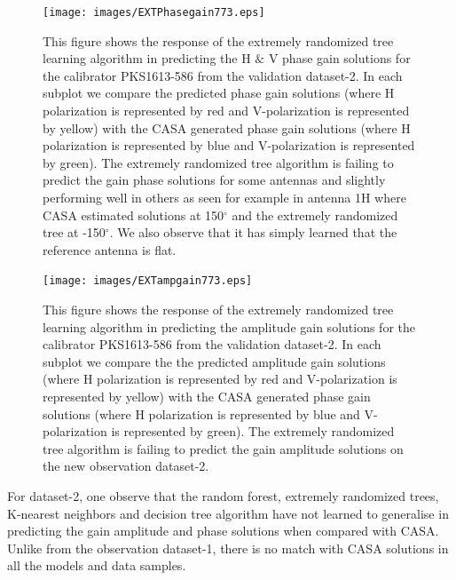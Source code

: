 \begin{figure}[H]
    \texttt{[image: images/EXTPhasegain773.eps]}
    \caption{This figure shows the response of the extremely randomized tree learning algorithm in predicting the H $\&$ V phase gain solutions for the calibrator PKS1613-586 from the validation dataset-2. In each subplot we compare the predicted phase gain solutions (where H polarization is represented by red and V-polarization is represented by yellow) with the CASA generated phase gain solutions (where H polarization is represented by blue and V-polarization is represented by green). The extremely randomized tree algorithm is failing to predict the gain phase solutions for some antennas and slightly performing well in others as seen for example in antenna 1H where CASA estimated solutions at 150$^\circ$ and the extremely randomized tree at -150$^\circ$. We also observe that it has simply learned that the reference antenna is flat.}
    \label{obs12}
\end{figure}

\begin{figure}[H]
    \texttt{[image: images/EXTampgain773.eps]}
    \caption{This figure shows the response of the extremely randomized tree learning algorithm in predicting the amplitude gain solutions for the calibrator PKS1613-586 from the validation dataset-2. In each subplot we compare the the predicted amplitude gain solutions (where H polarization is represented by red and V-polarization is represented by yellow) with the CASA generated phase gain solutions (where H polarization is represented by blue and V-polarization is represented by green). The extremely randomized tree algorithm is failing to predict the gain amplitude solutions on the new observation dataset-2.}
     \label{ea3}
\end{figure}

For dataset-2, one observe that the random forest, extremely randomized trees, K-nearest neighbors and decision tree algorithm have not learned to generalise in predicting the gain amplitude and phase solutions when compared with CASA. Unlike from the observation dataset-1, there is no match with CASA solutions in all the models and data samples. 







